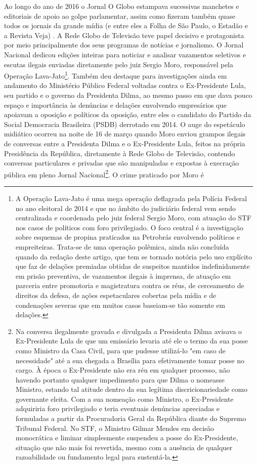 Ao longo do ano de 2016 o Jornal O Globo estampava sucessivas manchetes
e editoriais de apoio ao golpe parlamentar, assim como fizeram também
quase todos os jornais da grande mídia (e entre eles a Folha de São
Paulo, o Estadão e a Revista Veja) . A Rede Globo de Televisão teve
papel decisivo e protagonista por meio principalmente dos seus programas
de notícias e jornalismo. O Jornal Nacional dedicou edições inteiras
para noticiar e analisar vazamentos seletivos e escutas ilegais enviadas
diretamente pelo juiz Sergio Moro, responsável pela Operação
Lava-Jato\footnote{A Operação Lava-Jato é uma mega operação deflagrada
  pela Polícia Federal no ano eleitoral de 2014 e que no âmbito do
  judiciário federal vem sendo centralizada e coordenada pelo juiz
  federal Sergio Moro, com atuação do STF nos casos de políticos com
  foro privilegiado. O foco central é a investigação sobre esquemas de
  propina praticados na Petrobrás envolvendo políticos e empreiteiras.
  Trata-se de uma operação polêmica, ainda não concluída quando da
  redação deste artigo, que tem se tornado notória pelo uso explícito
  que faz de delações premiadas obtidas de suspeitos mantidos
  indefinidamente em prisão preventiva, de vazamentos ilegais à
  imprensa, de atuação em parceria entre promotoria e magistratura
  contra os réus, de cerceamento de direitos da defesa, de ações
  espetaculares cobertas pela mídia e de condenações severas que em
  muitos casos baseiam-se tão somente em delações.}. Também deu destaque
para investigações ainda em andamento do Ministério Público Federal
voltadas contra o Ex-Presidente Lula, seu partido e o governo da
Presidenta Dilma, ao mesmo passo em que dava pouco espaço e importância
às denúncias e delações envolvendo empresários que apoiavam a oposição e
políticos da oposição, entre eles o candidato do Partido da Social
Democracia Brasileira (PSDB) derrotado em 2014. O auge do espetáculo
midiático ocorreu na noite de 16 de março quando Moro enviou grampos
ilegais de conversas entre a Presidenta Dilma e o Ex-Presidente Lula,
feitos na própria Presidência da República, diretamente à Rede Globo de
Televisão, contendo conversas particulares e privadas que são
manipuladas e expostas à execração pública em pleno Jornal
Nacional\footnote{Na conversa ilegalmente gravada e divulgada a
  Presidenta Dilma avisava o Ex-Presidente Lula de que um emissário
  levaria até ele o termo da sua posse como Ministro da Casa Civil, para
  que pudesse utilizá-lo "em caso de necessidade" até a sua chegada a
  Brasília para efetivamente tomar posse no cargo. À época o
  Ex-Presidente não era réu em qualquer processo, não havendo portanto
  qualquer impedimento para que Dilma o nomeasse Ministro, estando tal
  atitude dentro da sua legítima discricionariedade como governante
  eleita. Com a sua nomeação como Ministro, o Ex-Presidente adquiriria
  foro privilegiado e teria eventuais denúncias apreciadas e formuladas
  a partir da Procuradoria Geral da República diante do Supremo Tribunal
  Federal. No STF, o Ministro Gilmar Mendes em decisão monocrática e
  liminar simplesmente suspendeu a posse do Ex-Presidente, situação que
  não mais foi revertida, mesmo com a ausência de qualquer razoabilidade
  ou fundamento legal para sustentá-la.}. O crime praticado por Moro é
